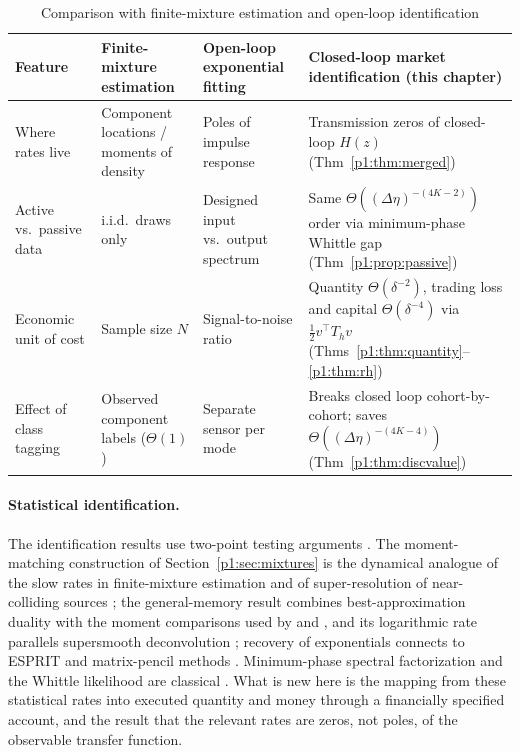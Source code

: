\begin{table}[t]\centering\small
\begin{threeparttable}
\caption{Comparison with finite-mixture estimation and open-loop identification}\label{p1:tab:novelty}
\setlength{\tabcolsep}{4pt}
\begin{tabular}{p{}p{}p{}p{}}
\toprule
Feature & Finite-mixture estimation \citep{p1:heinrich2018,p1:wu2020} & Open-loop exponential fitting \citep{p1:roy1989,p1:batenkov2021} & Closed-loop market identification (this chapter)\\
\midrule
Where rates live & Component locations / moments of density & Poles of impulse response & Transmission zeros of closed-loop $H(z)$ (Thm~\ref{p1:thm:merged})\\
Active vs.\ passive data & i.i.d.\ draws only & Designed input vs.\ output spectrum & Same $\Theta((\Delta\eta)^{-(4K-2)})$ order via minimum-phase Whittle gap (Thm~\ref{p1:prop:passive})\\
Economic unit of cost & Sample size $N$ & Signal-to-noise ratio & Quantity $\Theta(\delta^{-2})$, trading loss and capital $\Theta(\delta^{-4})$ via $\tfrac12v^\top T_hv$ (Thms~\ref{p1:thm:quantity}--\ref{p1:thm:rh})\\
Effect of class tagging & Observed component labels ($\Theta(1)$) & Separate sensor per mode & Breaks closed loop cohort-by-cohort; saves $\Theta((\Delta\eta)^{-(4K-4)})$ (Thm~\ref{p1:thm:discvalue})\\
\bottomrule
\end{tabular}
\end{threeparttable}
\end{table}

\paragraph{Statistical identification.} The identification results use two-point testing arguments \citep{p1:lecam1986,p1:tsybakov2009}. The moment-matching construction of Section~\ref{p1:sec:mixtures} is the dynamical analogue of the slow rates in finite-mixture estimation \citep{p1:manole2022} and of super-resolution of near-colliding sources \citep{p1:liu2023,p1:batenkov2021}; the general-memory result combines best-approximation duality \citep{p1:bernstein1914,p1:rivlin1981} with the moment comparisons used by \citet{p1:kong2017} and \citet{p1:wu2020}, and its logarithmic rate parallels supersmooth deconvolution \citep{p1:fan1991}; recovery of exponentials connects to ESPRIT and matrix-pencil methods \citep{p1:roy1989,p1:hua1990}. Minimum-phase spectral factorization and the Whittle likelihood are classical \citep{p1:whittle1953}. What is new here is the mapping from these statistical rates into executed quantity and money through a financially specified account, and the result that the relevant rates are zeros, not poles, of the observable transfer function.

